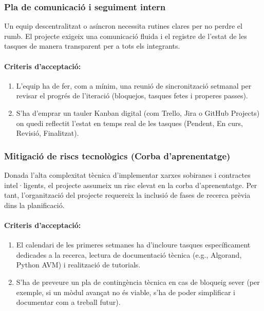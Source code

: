 \subsubsection{Pla de comunicació i seguiment intern}
Un equip descentralitzat o asíncron necessita rutines clares per no perdre el rumb. 
El projecte exigeix una comunicació fluida i el registre de l'estat de les tasques de manera transparent per a tots els integrants.

\paragraph{Criteris d'acceptació:}
\begin{enumerate}[label=\roman*.]
    \item L'equip ha de fer, com a mínim, una reunió de sincronització setmanal per revisar el progrés de l'iteració (bloquejos, tasques fetes i properes passes).
    \item S'ha d'emprar un tauler Kanban digital (com Trello, Jira o GitHub Projects) on quedi reflectit l'estat en temps real de les tasques (Pendent, En curs, Revisió, Finalitzat).
\end{enumerate}

\subsubsection{Mitigació de riscs tecnològics (Corba d'aprenentatge)}

Donada l'alta complexitat tècnica d'implementar xarxes sobiranes i contractes intel·ligents, el projecte assumeix un risc elevat en la corba d'aprenentatge. 
Per tant, l'organització del projecte requereix la inclusió de fases de recerca prèvia dins la planificació.

\paragraph{Criteris d'acceptació:}
\begin{enumerate}[label=\roman*.]
    \item El calendari de les primeres setmanes ha d'incloure tasques específicament dedicades a la recerca, lectura de documentació tècnica (e.g., Algorand, Python AVM) i realització de tutorials.
    \item S'ha de preveure un pla de contingència tècnica en cas de bloqueig sever (per exemple, si un mòdul avançat no és viable, s'ha de poder simplificar i documentar com a treball futur).
\end{enumerate}

